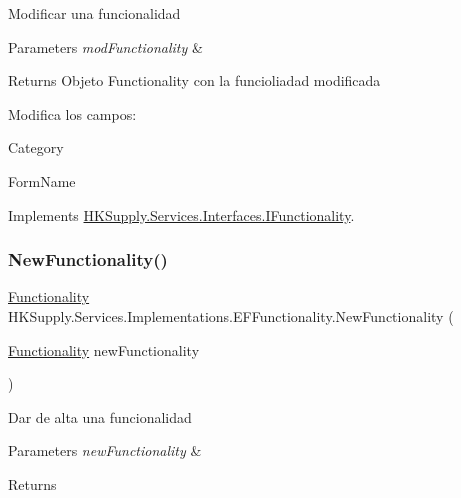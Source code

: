 Modificar una funcionalidad 


\begin{DoxyParams}{Parameters}
{\em mod\+Functionality} & \\
\hline
\end{DoxyParams}
\begin{DoxyReturn}{Returns}
Objeto Functionality con la funcioliadad modificada
\end{DoxyReturn}


Modifica los campos\+:
\begin{DoxyItemize}
\item Category
\item Form\+Name 
\end{DoxyItemize}

Implements \mbox{\hyperlink{interface_h_k_supply_1_1_services_1_1_interfaces_1_1_i_functionality}{H\+K\+Supply.\+Services.\+Interfaces.\+I\+Functionality}}.

\mbox{\label{class_h_k_supply_1_1_services_1_1_implementations_1_1_e_f_functionality_a43852b181d280c78c7c00b9d11c6d6c4}} 
\subsubsection{\texorpdfstring{New\+Functionality()}{NewFunctionality()}}
{\footnotesize\ttfamily \mbox{\hyperlink{class_h_k_supply_1_1_models_1_1_functionality}{Functionality}} H\+K\+Supply.\+Services.\+Implementations.\+E\+F\+Functionality.\+New\+Functionality (\begin{DoxyParamCaption}\item[{\mbox{\hyperlink{class_h_k_supply_1_1_models_1_1_functionality}{Functionality}}}]{new\+Functionality }\end{DoxyParamCaption})}



Dar de alta una funcionalidad 


\begin{DoxyParams}{Parameters}
{\em new\+Functionality} & \\
\hline
\end{DoxyParams}
\begin{DoxyReturn}{Returns}

\end{DoxyReturn}


